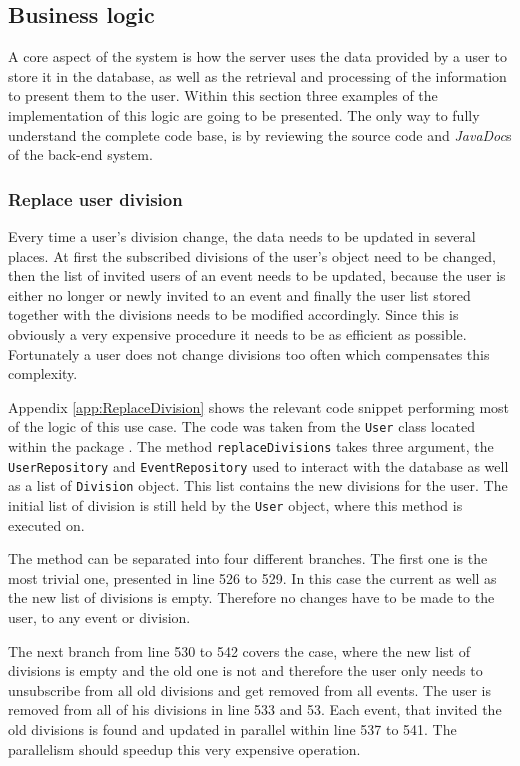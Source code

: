 \subsection{Business logic}

A core aspect of the system is how the server uses the data provided by a user to store it in the database, as well as the retrieval and processing of the information to present them to the user. Within this section three examples of the implementation of this logic are going to be presented. The only way to fully understand the complete code base, is by reviewing the source code and \emph{JavaDoc}s of the back-end system. 

\subsubsection{Replace user division}
Every time a user's division change, the data needs to be updated in several places. At first the subscribed divisions of the user's object need to be changed, then the list of invited users of an event needs to be updated, because the user is either no longer or newly invited to an event and finally the user list stored together with the divisions needs to be modified accordingly. Since this is obviously a very expensive procedure it needs to be as efficient as possible. Fortunately a user does not change divisions too often which compensates this complexity.

Appendix \vref{app:ReplaceDivision} shows the relevant code snippet performing most of the logic of this use case. The code was taken from the \texttt{User} class located within the package . The method \texttt{replaceDivisions} takes three argument, the \texttt{UserRepository} and \texttt{EventRepository} used to interact with the database as well as a list of \texttt{Division} object. This list contains the new divisions for the user. The initial list of division is still held by the \texttt{User} object, where this method is executed on.

The method can be separated into four different branches. The first one is the most trivial one, presented in line 526 to 529. In this case the current as well as the new list of divisions is empty. Therefore no changes have to be made to the user, to any event or division.

The next branch from line 530 to 542 covers the case, where the new list of divisions is empty and the old one is not and therefore the user only needs to unsubscribe from all old divisions and get removed from all events. The user is removed from all of his divisions in line 533 and 53. Each event, that invited the old divisions is found and updated in parallel within line 537 to 541. The parallelism should speedup this very expensive operation.

